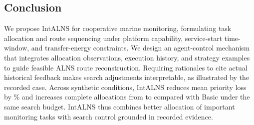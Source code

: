 \begin{samepage}
\section{Conclusion}
We propose IntALNS for cooperative marine monitoring, formulating task allocation and route sequencing under platform capability, service-start time-window, and transfer-energy constraints. We design an agent-control mechanism that integrates allocation observations, execution history, and strategy examples to guide feasible ALNS route reconstruction. Requiring rationales to cite actual historical feedback makes search adjustments interpretable, as illustrated by the recorded case. Across \PairCount{} synthetic conditions, IntALNS reduces mean priority loss by \PriorityReduction\% and increases complete allocations from \BasicComplete{} to \AgentComplete{} compared with Basic under the same search budget. IntALNS thus combines better allocation of important monitoring tasks with search control grounded in recorded evidence.
\par\end{samepage}
